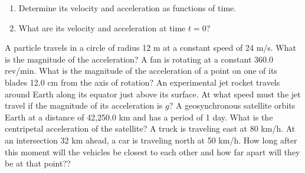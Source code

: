 \documentclass[12pt,addpoints]{exam}
\begin{document}
\begin{center}
\begin{questions}
			\begin{enumerate}[label=(\alph*)]
				\item Determine its velocity and acceleration as functions of time. \vspace{1in}
				\item What are its velocity and acceleration at time $t = 0$?\vspace{1in}
			\end{enumerate}
			\question A particle travels in a circle of radius 12 m at a constant speed of 24 m/s. What is the magnitude of the acceleration?\vspace{1in}
			\question A fan is rotating at a constant 360.0 rev/min. What is the magnitude of the acceleration of a point on one of its blades 12.0 cm from the axis of rotation?\vspace{1in}
			\question An experimental jet rocket travels around Earth along its equator just above its surface. At what speed must the jet travel if the magnitude of its acceleration is $g$?\vspace{1in}
			\question A geosynchronous satellite orbits Earth at a distance of 42,250.0 km and has a period of 1 day. What is the centripetal acceleration of the satellite?\vspace{1in}
			\question A truck is traveling east at 80 km/h. At an intersection 32 km ahead, a car is traveling north at 50 km/h. How long after this moment will the vehicles be closest to each other and how far apart will they be at that point??\vspace{1in}
			
		\end{questions}	
	\end{center}		
\end{document}
